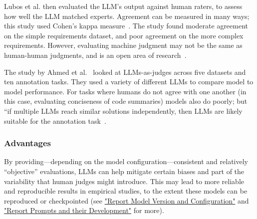 Lubos et al. then evaluated the LLM's output against human raters, to assess how well the LLM matched experts. 
Agreement can be measured in many ways; this study used Cohen's kappa measure~\cite{cohen60}. The study found moderate agreement on the simple requirements dataset, and poor agreement on the more complex requirements. However, evaluating machine judgment may not be the same as human-human judgments, and is an open area of research~\cite{DBLP:journals/corr/abs-2410-03775}. 

The study by Ahmed et al.~\cite{DBLP:journals/corr/abs-2408-05534} looked at LLMs-as-judges across five datasets and ten annotation tasks. They used a variety of different LLMs to compare model to model performance. For tasks where humans do not agree with one another (in this case, evaluating conciseness of code summaries) models also do poorly; but ``if multiple LLMs reach similar solutions independently, then LLMs are likely suitable for the annotation task~\cite[p.6]{DBLP:journals/corr/abs-2408-05534}.



\subsubsection{Advantages}

By providing---depending on the model configuration---consistent and relatively ``objective'' evaluations, LLMs can help mitigate certain biases and part of the variability that human judges might introduce. 
This may lead to more reliable and reproducible results in empirical studies, to the extent these models can be reproduced or checkpointed (see \href{/guidelines/#report-model-version-and-configuration}{"Report Model Version and Configuration"} and \href{/guidelines/#report-prompts-and-their-development}{"Report Prompts and their Development"} for more).

